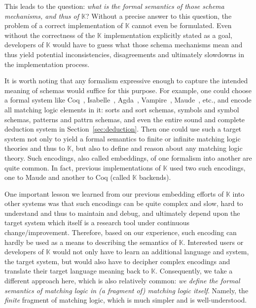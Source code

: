 \documentclass[UTF8,11pt]{article}
\theoremstyle{plain}
\theoremstyle{definition}
\theoremstyle{remark}
\newcommand{\K}{\mbox{$\mathbb{K}$}\xspace}
\begin{document}
This leads to the question:
\emph{what is the formal semantics of those schema mechanisms, and thus
of \K}?
Without a precise answer to this question, the problem of a correct
implementation of \K cannot even be formulated.
Even without the correctness of the \K implementation explicitly stated as a goal,
developers of \K would have to guess what those schema mechanisms mean and
thus yield potential inconsistencies, disagreements and ultimately slowdowns
in the implementation process.

It is worth noting that any formalism expressive enough to capture the intended
meaning of schemas would suffice for this purpose.
For example, one could choose a formal system like Coq~\cite{coq},
Isabelle~\cite{isabelle}, Agda~\cite{agda}, Vampire~\cite{vampire},
Maude~\cite{clavel-et-al99a}, etc., and encode all matching logic elements in
it:
sorts and sort schemas, symbols and symbol schemas, patterns and
pattrn schemas, and even the entire sound and complete deduction system in
Section~\ref{sec:deduction}.
Then one could use such a target system not only to yield a formal semantics
to finite or infinite matching logic theories and thus to \K, but also to
define and reason about any matching logic theory.
Such encodings, also called embeddings, of one formalism into another are
quite common.
In fact, previous implementations of \K used two such encodings, one to
Maude and another to Coq (called \K backends).

One important lesson we learned from our previous embedding efforts of \K
into other systems was that such encodings can be quite complex and slow,
hard to understand and thus to maintain and debug, and ultimately depend
upon the target system which itself is a research tool under continuous
change/improvement.
Therefore, based on our experience, such encoding can hardly
be used as a means to describing the semantics of \K.
Interested users or developers of \K would not only have to learn an
additional language and system, the target system, but would also have to
decipher complex encodings and translate their target language meaning back
to \K.
Consequently, we take a different approach here, which is also relatively
common:
\emph{we define the formal semantics of matching logic in (a fragment of)
matching logic itself}.
Namely, the \emph{finite} fragment of matching logic, which is much simpler
and is well-understood.
\end{document}
